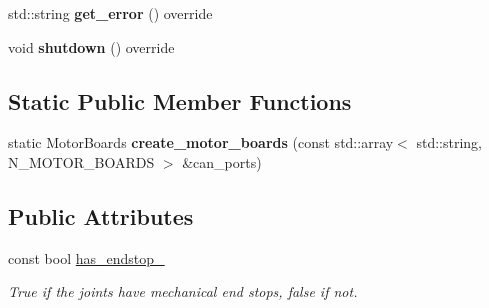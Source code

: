 \begin{DoxyCompactItemize}
\item 
std\+::string {\bfseries get\+\_\+error} () override\hypertarget{classblmc__robots_1_1NJointBlmcRobotDriver_a6914754d6bd5bf9e0d2d4cdaa2f140d4}{}\label{classblmc__robots_1_1NJointBlmcRobotDriver_a6914754d6bd5bf9e0d2d4cdaa2f140d4}

\item 
void {\bfseries shutdown} () override\hypertarget{classblmc__robots_1_1NJointBlmcRobotDriver_a1dc679a59e08fdd97d4bb92f41178445}{}\label{classblmc__robots_1_1NJointBlmcRobotDriver_a1dc679a59e08fdd97d4bb92f41178445}

\end{DoxyCompactItemize}
\subsection*{Static Public Member Functions}
\begin{DoxyCompactItemize}
\item 
static Motor\+Boards {\bfseries create\+\_\+motor\+\_\+boards} (const std\+::array$<$ std\+::string, N\+\_\+\+M\+O\+T\+O\+R\+\_\+\+B\+O\+A\+R\+DS $>$ \&can\+\_\+ports)\hypertarget{classblmc__robots_1_1NJointBlmcRobotDriver_ae8d7e4d37b3a0ba6966311c9813caec0}{}\label{classblmc__robots_1_1NJointBlmcRobotDriver_ae8d7e4d37b3a0ba6966311c9813caec0}

\end{DoxyCompactItemize}
\subsection*{Public Attributes}
\begin{DoxyCompactItemize}
\item 
const bool \hyperlink{classblmc__robots_1_1NJointBlmcRobotDriver_a4da9d51841e9b2995e597ae52c460586}{has\+\_\+endstop\+\_\+}
\begin{DoxyCompactList}\small\item\em True if the joints have mechanical end stops, false if not. \end{DoxyCompactList}\end{DoxyCompactItemize}
